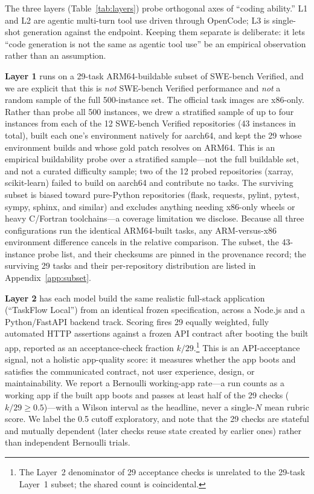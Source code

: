 \documentclass[10pt,twocolumn]{article}
\begin{document}
The three layers (Table~\ref{tab:layers}) probe orthogonal axes of ``coding ability.'' L1 and
L2 are agentic multi-turn tool use driven through OpenCode; L3 is single-shot generation
against the endpoint. Keeping them separate is deliberate: it lets ``code generation is not
the same as agentic tool use'' be an empirical observation rather than an assumption.

\textbf{Layer 1} runs on a 29-task ARM64-buildable subset of SWE-bench Verified, and we are
explicit that this is \emph{not} SWE-bench Verified performance and \emph{not} a random sample
of the full 500-instance set. The official task images are x86-only. Rather than probe all
500 instances, we drew a stratified sample of up to four instances from each of the 12
SWE-bench Verified repositories (43 instances in total), built each one's environment natively
for aarch64, and kept the 29 whose environment builds and whose gold patch resolves on ARM64.
This is an empirical buildability probe over a stratified sample---not the full buildable set,
and not a curated difficulty sample; two of the 12 probed repositories (xarray, scikit-learn)
failed to build on aarch64 and contribute no tasks. The surviving subset is biased toward
pure-Python repositories (flask, requests, pylint, pytest, sympy, sphinx, and similar) and
excludes anything needing x86-only wheels or heavy C/Fortran toolchains---a coverage
limitation we disclose. Because all three configurations run the identical ARM64-built tasks,
any ARM-versus-x86 environment difference cancels in the relative comparison. The subset, the
43-instance probe list, and their checksums are pinned in the provenance record; the
surviving 29 tasks and their per-repository distribution are listed in Appendix~\ref{app:subset}.

\textbf{Layer 2} has each model build the same realistic full-stack application (``TaskFlow
Local'') from an identical frozen specification, across a Node.js and a Python/FastAPI backend
track. Scoring fires 29 equally weighted, fully automated HTTP assertions against a frozen API
contract after booting the built app, reported as an acceptance-check fraction $k/29$.\footnote{The
Layer~2 denominator of 29 acceptance checks is unrelated to the 29-task Layer~1 subset; the
shared count is coincidental.} This is
an API-acceptance signal, not a holistic app-quality score: it measures whether the app boots
and satisfies the communicated contract, not user experience, design, or maintainability. We
report a Bernoulli working-app rate---a run counts as a working app if the built app boots and
passes at least half of the 29 checks ($k/29 \ge 0.5$)---with a Wilson interval as the
headline, never a single-$N$ mean rubric score. We label the 0.5 cutoff exploratory, and note
that the 29 checks are stateful and mutually dependent (later checks reuse state created by
earlier ones) rather than independent Bernoulli trials.
\end{document}

